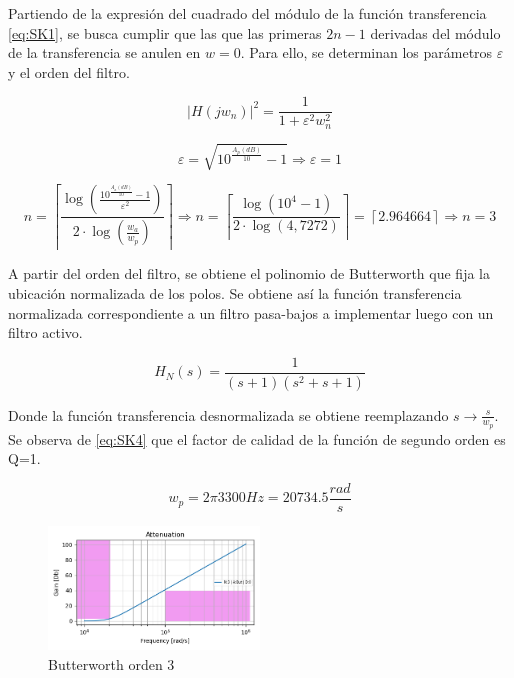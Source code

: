 Partiendo de la expresión del cuadrado del módulo de la función transferencia \ref{eq:SK1}, se busca cumplir que las que las primeras $2n − 1$ derivadas del módulo de la transferencia se anulen en $w=0$. Para ello, se determinan los parámetros $\varepsilon$ y el orden del filtro. 

\begin{equation}
        \left | H(jw_{n}) \right |^{2} = \frac{1}{1+\varepsilon ^{2}w_{n}^{2}}
    \label{eq:SK1}
\end{equation}

\begin{equation}
        \varepsilon = \sqrt{10^{\frac{A_{p}(dB)}{10}}-1} \Rightarrow \varepsilon = 1
    \label{eq:SK2}
\end{equation}

\begin{equation}
        n = \left \lceil  \frac{\log \left ( \frac{10^{\frac{A_{a}(dB)}{10}}-1}{\varepsilon ^{2}} \right )}{2\cdot \log \left (\frac{w_{a}}{w_{p}} \right )} \right \rceil \Rightarrow n = \left \lceil  \frac{\log \left ( 10^{4}-1 \right )}{2\cdot \log \left (4,7272 \right )} \right \rceil = \left \lceil 2.964664 \right \rceil \Rightarrow n = 3 
    \label{eq:SK3}
\end{equation}


A partir del orden del filtro, se obtiene el polinomio de Butterworth que fija la ubicación normalizada de los polos. Se obtiene así la función transferencia normalizada correspondiente a un filtro pasa-bajos a implementar luego con un filtro activo. 


\begin{equation}
        H_{N}(s) = \frac{1}{(s+1)(s^{2}+s+1)}
    \label{eq:SK4}
\end{equation}

Donde la función transferencia desnormalizada se obtiene reemplazando $s\rightarrow \frac{s}{w_{p}}$. Se observa de \ref{eq:SK4} que el factor de calidad de la función de segundo orden es Q=1.

$$w_{p} = 2 \pi 3300 Hz = 20734.5 \frac{rad}{s}$$

\begin{figure}[H]
    \centering
    \includegraphics[width= 0.5\textwidth]{../Ejercicio2-DisenoDeCeldas/1CeldaSallenKey/images/AtenuacionButter.png}
    \caption{Butterworth orden 3}
    \label{fig:butter3}
\end{figure}


